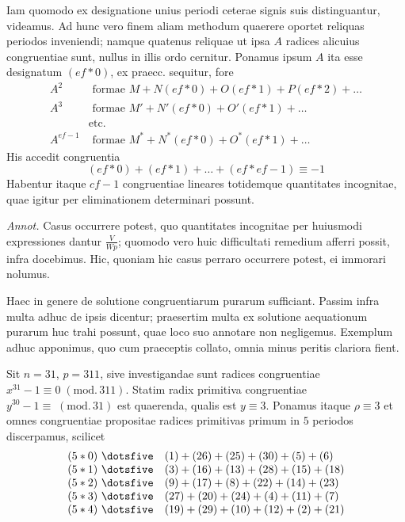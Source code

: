 Iam quomodo ex designatione unius periodi ceterae signis suis distinguantur, videamus. Ad hunc vero finem aliam methodum quaerere oportet reliquas periodos inveniendi; namque quatenus reliquae ut ipsa $A$ radices alicuius congruentiae sunt, nullus in illis ordo cernitur. Ponamus ipsum $A$ ita esse designatum $(ef\ast0)$, ex praecc. sequitur, fore
\[
\begin{aligned}
A^2&\text{ formae }M+N(ef\ast0)+O(ef\ast1)+P(ef\ast2)+\ldots\\
A^3&\text{ formae }M'+N'(ef\ast0)+O'(ef\ast1)+\ldots\\
&\text{etc.}\\
A^{ef-1}&\text{ formae }M^\ast+N^\ast(ef\ast0)+O^\ast(ef\ast1)+\ldots
\end{aligned}
\]
His accedit congruentia
\[
(ef\ast0)+(ef\ast1)+\ldots+(ef\ast ef-1)\equiv-1
\]
Habentur itaque $cf-1$ congruentiae lineares totidemque quantitates incognitae, quae igitur per eliminationem determinari possunt.

\emph{Annot.} Casus occurrere potest, quo quantitates incognitae per huiusmodi expressiones dantur $\frac{V}{Wp}$; quomodo vero huic difficultati remedium afferri possit, infra docebimus. Hic, quoniam hic casus perraro occurrere potest, ei immorari nolumus.

Haec in genere de solutione congruentiarum purarum sufficiant. Passim infra multa adhuc de ipsis dicentur; praesertim multa ex solutione aequationum purarum huc trahi possunt, quae loco suo annotare non negligemus. Exemplum adhuc apponimus, quo cum praeceptis collato, omnia minus peritis clariora fient.

Sit $n=31$, $p=311$, sive investigandae sunt radices congruentiae $x^{31}-1\equiv0\;(\mathrm{mod.}\,311)$. Statim radix primitiva congruentiae $y^{30}-1\equiv\;(\mathrm{mod.}\,31)$ est quaerenda, qualis est $y\equiv3$. Ponamus itaque $\rho\equiv3$ et omnes congruentiae propositae radices primitivas primum in $5$ periodos discerpamus, scilicet
\[
\begin{array}{rl}
(5\ast0)\ \dotsfive&(1)+(26)+(25)+(30)+(5)+(6)\\
(5\ast1)\ \dotsfive&(3)+(16)+(13)+(28)+(15)+(18)\\
(5\ast2)\ \dotsfive&(9)+(17)+(8)+(22)+(14)+(23)\\
(5\ast3)\ \dotsfive&(27)+(20)+(24)+(4)+(11)+(7)\\
(5\ast4)\ \dotsfive&(19)+(29)+(10)+(12)+(2)+(21)
\end{array}
\]

